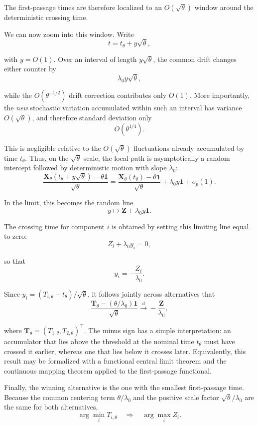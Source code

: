 \documentclass[
  man,
  floatsintext,
  longtable,
  a4paper,
  nolmodern,
  notxfonts,
  notimes,
  colorlinks=true,linkcolor=blue,citecolor=blue,urlcolor=blue]{apa7}
\begin{document}
The first-passage times are therefore localized to an
\(O(\sqrt{\theta})\) window around the deterministic crossing time.

We can now zoom into this window. Write \[
t=t_\theta+y\sqrt{\theta},
\]

with \(y=O(1)\). Over an interval of length \(y\sqrt{\theta}\), the
common drift changes either counter by \[
\lambda_0y\sqrt{\theta},
\]

while the \(O(\theta^{-1/2})\) drift correction contributes only
\(O(1)\). More importantly, the \emph{new} stochastic variation
accumulated within such an interval has variance \(O(\sqrt{\theta})\),
and therefore standard deviation only \[
O(\theta^{1/4}).
\]

This is negligible relative to the \(O(\sqrt{\theta})\) fluctuations
already accumulated by time \(t_\theta\). Thus, on the \(\sqrt{\theta}\)
scale, the local path is asymptotically a random intercept followed by
deterministic motion with slope \(\lambda_0\): \[
\frac{
\mathbf X_\theta(t_\theta+y\sqrt{\theta})
-\theta\mathbf 1
}{
\sqrt{\theta}
}
=
\frac{
\mathbf X_\theta(t_\theta)-\theta\mathbf 1
}{
\sqrt{\theta}
}
+
\lambda_0y\mathbf 1
+
o_p(1).
\]

In the limit, this becomes the random line \[
y\mapsto
\mathbf Z+\lambda_0y\mathbf 1.
\]

The crossing time for component \(i\) is obtained by setting this
limiting line equal to zero: \[
Z_i+\lambda_0y_i=0,
\]

so that \[
y_i=-\frac{Z_i}{\lambda_0}.
\]

Since \(y_i=(T_{i,\theta}-t_\theta)/\sqrt{\theta}\), it follows jointly
across alternatives that \[
\frac{
\mathbf T_\theta-(\theta/\lambda_0)\mathbf 1
}{
\sqrt{\theta}
}
\xrightarrow{d}
-\frac{\mathbf Z}{\lambda_0},
\]

where \(\mathbf T_\theta=(T_{1,\theta},T_{2,\theta})^\top\). The minus
sign has a simple interpretation: an accumulator that lies above the
threshold at the nominal time \(t_\theta\) must have crossed it earlier,
whereas one that lies below it crosses later. Equivalently, this result
may be formalized with a functional central limit theorem and the
continuous mapping theorem applied to the first-passage functional.

Finally, the winning alternative is the one with the smallest
first-passage time. Because the common centering term
\(\theta/\lambda_0\) and the positive scale factor
\(\sqrt{\theta}/\lambda_0\) are the same for both alternatives, \[
\arg\min_i T_{i,\theta}
\quad\Longrightarrow\quad
\arg\max_i Z_i.
\]
\end{document}
